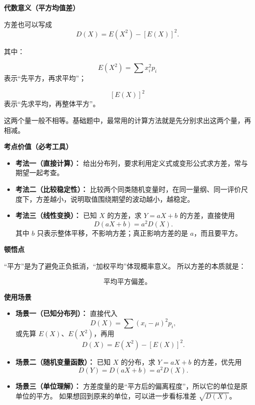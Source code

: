 \begin{explanationbox}
	\textbf{\textcolor{CExplanation}{代数意义（平方均值差）}}

	方差也可以写成
	\[
		D(X)=E(X^2)-[E(X)]^2.
	\]

	其中：

	\[
		E(X^2)=\sum x_i^2p_i
	\]
	表示“先平方，再求平均”；

	\[
		[E(X)]^2
	\]
	表示“先求平均，再整体平方”。

	这两个量一般不相等。基础题中，最常用的计算方法就是先分别求出这两个量，再相减。

	\medskip

	\textbf{\textcolor{CExplanation}{考点价值（必考工具）}}

	\begin{itemize}[leftmargin=*, itemsep=0.5em, topsep=0.4em]
		\item \textbf{考法一（直接计算）：}
		      给出分布列，要求利用定义式或变形公式求方差，常与期望一起考查。

		\item \textbf{考法二（比较稳定性）：}
		      比较两个同类随机变量时，在同一量纲、同一评价尺度下，方差越小，说明取值围绕期望的波动越小，越稳定。

		\item \textbf{考法三（线性变换）：}
		      已知 $X$ 的方差，求 $Y=aX+b$ 的方差，直接使用
		      \[
			      D(aX+b)=a^2D(X).
		      \]
		      其中 $b$ 只表示整体平移，不影响方差；真正影响方差的是 $a$，而且要平方。
	\end{itemize}

	\medskip

	\textbf{\textcolor{CExplanation}{顿悟点}}

	“平方”是为了避免正负抵消，“加权平均”体现概率意义。
	所以方差的本质就是：

	\[
		\boxed{\text{平均平方偏差。}}
	\]

	\medskip

	\textbf{\textcolor{CExplanation}{使用场景}}

	\begin{itemize}[leftmargin=*, itemsep=0.5em, topsep=0.4em]
		\item \textbf{场景一（已知分布列）：}
		      直接代入
		      \[
			      D(X)=\sum (x_i-\mu)^2p_i,
		      \]
		      或先算 $E(X)$、$E(X^2)$，再用
		      \[
			      D(X)=E(X^2)-[E(X)]^2.
		      \]

		\item \textbf{场景二（随机变量函数）：}
		      已知 $X$ 的分布，求 $Y=aX+b$ 的方差，优先用
		      \[
			      D(Y)=D(aX+b)=a^2D(X).
		      \]

		\item \textbf{场景三（单位理解）：}
		      方差度量的是“平方后的偏离程度”，所以它的单位是原单位的平方。
		      如果想回到原来的单位，可以进一步看标准差 $\sqrt{D(X)}$。
	\end{itemize}
\end{explanationbox}